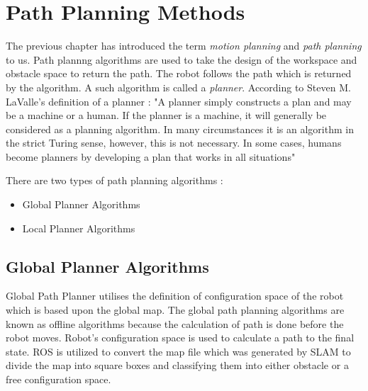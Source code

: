 \section{Path Planning Methods}
The previous chapter has introduced the term \textit{motion planning} and \textit{path planning} to us. Path plannng algorithms are used to take the design of the workspace and obstacle space to return the path. The robot follows the path which is returned by the algorithm.
A such algorithm is called a \textit{planner}. According to Steven M. LaValle's definition of a planner \cite{lavelle} : "A planner simply constructs a plan and may be a machine or a human. If the planner is a machine, it will
generally be considered as a planning algorithm. In many circumstances it is an algorithm
in the strict Turing sense, however, this is not necessary. In some cases, humans become
planners by developing a plan that works in all situations"

There are two types of path planning algorithms : 
\begin{itemize}
    \item Global Planner Algorithms
    \item Local Planner Algorithms
\end{itemize}

\subsection{Global Planner Algorithms}\label{planner-algorithms}
Global Path Planner utilises the definition of configuration space of the robot which is based upon the global map.
The global path planning algorithms are known as offline algorithms because the calculation of path is done before the robot moves. Robot's configuration space is used to calculate a path to the final state.
ROS is utilized to convert the map file which was generated by SLAM to divide the map into square boxes and classifying 
them into either obstacle or a free configuration space.

